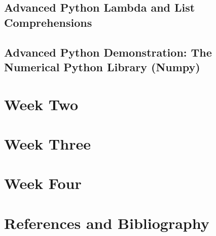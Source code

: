 \documentclass[11pt]{article}
\begin{document}
    \subsection{Advanced Python Lambda and List Comprehensions}
    
    \subsection{Advanced Python Demonstration: The Numerical Python Library (Numpy)}
    
    



\section{Week Two}

\section{Week Three}

\section{Week Four}



















\section{References and Bibliography}






\end{document}
